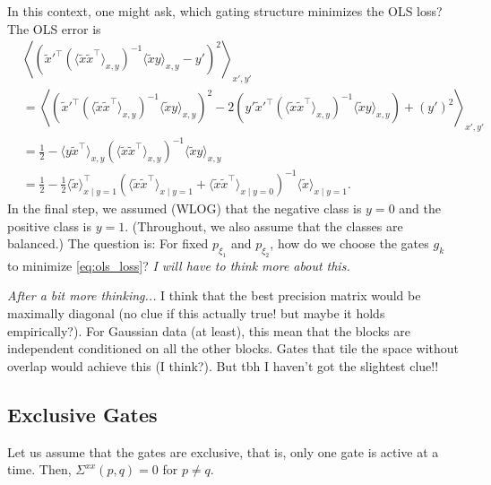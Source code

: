 \documentclass{article}
\begin{document}
In this context, one might ask, which gating structure minimizes the OLS loss?
The OLS error is
\begin{align}
  &\left\langle \left( \tilde{x}'^\top (\langle \tilde{x} \tilde{x}^\top \rangle_{x,y})^{-1} \langle \tilde{x} y \rangle_{x,y} - y' \right)^2 \right\rangle_{x',y'} \\
  &= \left\langle ( \tilde{x}'^\top (\langle \tilde{x} \tilde{x}^\top \rangle_{x,y})^{-1} \langle \tilde{x} y \rangle_{x,y} )^2 - 2 ( y' \tilde{x}'^\top (\langle \tilde{x} \tilde{x}^\top \rangle_{x,y})^{-1} \langle \tilde{x} y \rangle_{x,y} ) + (y')^2 \right\rangle_{x',y'} \\
  &= \frac{1}{2} - \langle y \tilde{x}^\top \rangle_{x,y} (\langle \tilde{x} \tilde{x}^\top \rangle_{x,y})^{-1} \langle \tilde{x} y \rangle_{x,y} \\
  &= \frac{1}{2} - \frac{1}{2} \langle \tilde{x} \rangle_{x \mid y=1}^\top (\langle \tilde{x} \tilde{x}^\top \rangle_{x \mid y=1} + \langle \tilde{x} \tilde{x}^\top \rangle_{x \mid y=0})^{-1} \langle \tilde{x} \rangle_{x \mid y=1}. \label{eq:ols_loss}
\end{align}
In the final step, we assumed (WLOG) that the negative class is $y=0$ and the positive class is $y=1$.
(Throughout, we also assume that the classes are balanced.)
The question is: For fixed $p_{\xi_1}$ and $p_{\xi_2}$, how do we choose the gates $g_k$ to minimize \cref{eq:ols_loss}?
\emph{I will have to think more about this.}

\emph{After a bit more thinking...}
I think that the best precision matrix would be maximally diagonal (no clue if this actually true! but maybe it holds empirically?).
For Gaussian data (at least), this mean that the blocks are independent conditioned on all the other blocks.
Gates that tile the space without overlap would achieve this (I think?).
But tbh I haven't got the slightest clue!!



\subsection{Exclusive Gates}
Let us assume that the gates are exclusive, that is, only one gate is active at a time.
Then, $\Sigma^{xx}(p,q) = 0$ for $p \neq q$.
\end{document}
